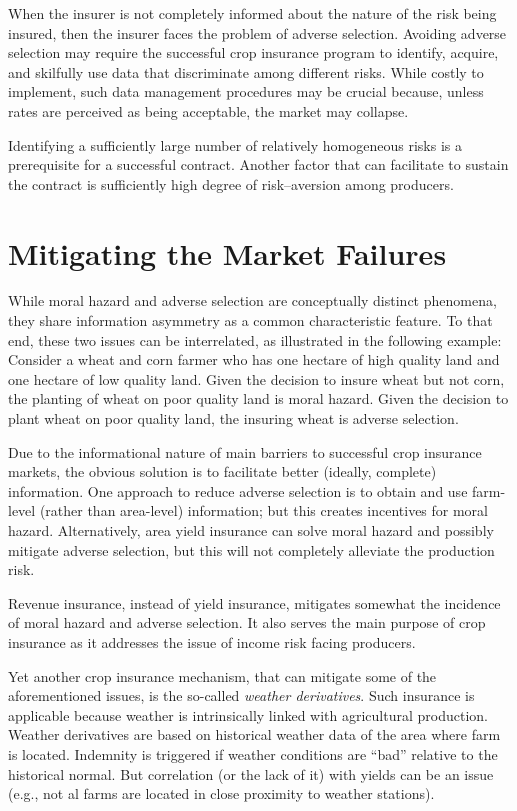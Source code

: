 \documentclass[
]{book}
\begin{document}
When the insurer is not completely informed about the nature of the risk being insured, then the insurer faces the problem of adverse selection. Avoiding adverse selection may require the successful crop insurance program to identify, acquire, and skilfully use data that discriminate among different risks. While costly to implement, such data management procedures may be crucial because, unless rates are perceived as being acceptable, the market may collapse.

Identifying a sufficiently large number of relatively homogeneous risks is a prerequisite for a successful contract. Another factor that can facilitate to sustain the contract is sufficiently high degree of risk--aversion among producers.

\hypertarget{mitigating-the-market-failures}{%
\section{Mitigating the Market Failures}\label{mitigating-the-market-failures}}

While moral hazard and adverse selection are conceptually distinct phenomena, they share information asymmetry as a common characteristic feature. To that end, these two issues can be interrelated, as illustrated in the following example: Consider a wheat and corn farmer who has one hectare of high quality land and one hectare of low quality land. Given the decision to insure wheat but not corn, the planting of wheat on poor quality land is moral hazard. Given the decision to plant wheat on poor quality land, the insuring wheat is adverse selection.

Due to the informational nature of main barriers to successful crop insurance markets, the obvious solution is to facilitate better (ideally, complete) information. One approach to reduce adverse selection is to obtain and use farm-level (rather than area-level) information; but this creates incentives for moral hazard. Alternatively, area yield insurance can solve moral hazard and possibly mitigate adverse selection, but this will not completely alleviate the production risk.

Revenue insurance, instead of yield insurance, mitigates somewhat the incidence of moral hazard and adverse selection. It also serves the main purpose of crop insurance as it addresses the issue of income risk facing producers.

Yet another crop insurance mechanism, that can mitigate some of the aforementioned issues, is the so-called \emph{weather derivatives}. Such insurance is applicable because weather is intrinsically linked with agricultural production. Weather derivatives are based on historical weather data of the area where farm is located. Indemnity is triggered if weather conditions are ``bad'' relative to the historical normal. But correlation (or the lack of it) with yields can be an issue (e.g., not al farms are located in close proximity to weather stations).
\end{document}
